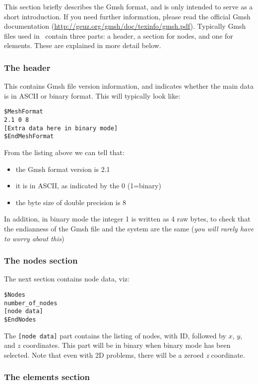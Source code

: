 This section briefly describes the Gmsh format, and is only intended
to serve as a short introduction. If you need further
information, please read the official Gmsh documentation
(\url{http://geuz.org/gmsh/doc/texinfo/gmsh.pdf}).
Typically Gmsh files used in \fluidity\ contain three parts: a header, a
section for nodes, and one for elements. These  are explained in more
detail below.



\subsubsection*{The header}\label{sect:gmsh_header_section}
This contains Gmsh file version information, and indicates whether 
the main data is in ASCII or binary format. This will typically look like:
\begin{lstlisting}
$MeshFormat
2.1 0 8
[Extra data here in binary mode]
$EndMeshFormat
\end{lstlisting}

From the listing above we can tell that:
\begin{itemize}
\item the Gmsh format version is 2.1
\item it is in ASCII, as indicated by the 0 (1=binary)
\item the byte size of double precision is 8
\end{itemize}
In addition, in binary mode the integer 1 is written as 4 raw bytes, to check that the endianness of the Gmsh file and the system are the same (\textit{you will rarely have to worry about this})



\subsubsection*{The nodes section}\label{sect:gmsh_nodes_section}

The next section contains node data, viz:
\begin{lstlisting}
$Nodes
number_of_nodes
[node data]
$EndNodes
\end{lstlisting}

The \lstinline+[node data]+ part contains the listing of nodes, with ID,
followed by $x$, $y$, and $z$ coordinates. This part
will be in binary when binary mode has been selected. Note that even with 2D
problems, there will be a zeroed \textit{z} coordinate.



\subsubsection*{The elements section}\label{sect:gmsh_elements_section}

